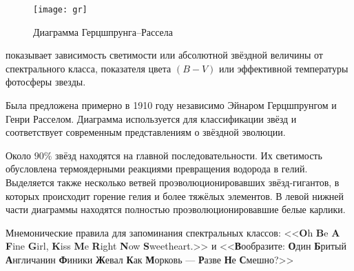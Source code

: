 \begin{figure}[h!]
	\centering
	\vspace{-1pc}
	\texttt{[image: gr]}
 	\caption{Диаграмма Герцшпрунга--Рассела}
 	\label{pic:d-cep}
\end{figure}
 показывает зависимость светимости или абсолютной звёздной величины от спектрального класса, показателя цвета $(B-V)$ или эффективной температуры фотосферы звезды.

Была предложена примерно в 1910 году независимо Эйнаром Герцшпрунгом и Генри Расселом. Диаграмма используется для классификации звёзд и соответствует современным представлениям о звёздной эволюции.

Около $90 \%$ звёзд находятся на главной последовательности. Их светимость обусловлена термоядерными реакциями превращения водорода в гелий. Выделяется также несколько ветвей проэволюционировавших звёзд-гигантов, в которых происходит горение гелия и более тяжёлых элементов. В левой нижней части диаграммы находятся полностью проэволюционировавшие белые карлики.

Мнемонические правила для запоминания спектральных классов: <<\textbf{O}h \textbf{B}e \textbf{A} \textbf{F}ine \textbf{G}irl, \textbf{K}iss \textbf{M}e \textbf{R}ight \textbf{N}ow \textbf{S}weetheart.>> и <<\textbf{В}ообразите: \textbf{О}дин \textbf{Б}ритый \textbf{А}нгличанин \textbf{Ф}иники \textbf{Ж}евал \textbf{К}ак \textbf{М}орковь --- \textbf{Р}азве \textbf{Н}е \textbf{С}мешно?>>

